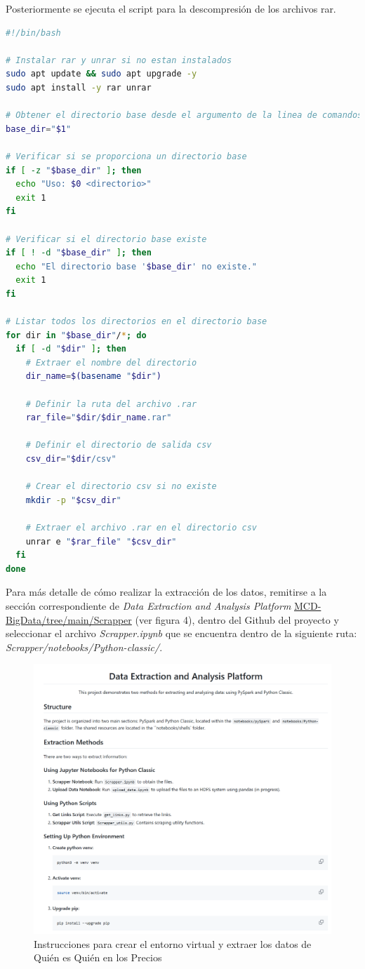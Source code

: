 \documentclass{article}
\begin{document}
Posteriormente se ejecuta el script para la descompresión de los archivos rar.

\begin{lstlisting}[language=bash,caption={bash version}]
#!/bin/bash

# Instalar rar y unrar si no estan instalados
sudo apt update && sudo apt upgrade -y
sudo apt install -y rar unrar

# Obtener el directorio base desde el argumento de la linea de comandos
base_dir="$1"

# Verificar si se proporciona un directorio base
if [ -z "$base_dir" ]; then
  echo "Uso: $0 <directorio>"
  exit 1
fi

# Verificar si el directorio base existe
if [ ! -d "$base_dir" ]; then
  echo "El directorio base '$base_dir' no existe."
  exit 1
fi

# Listar todos los directorios en el directorio base
for dir in "$base_dir"/*; do
  if [ -d "$dir" ]; then
    # Extraer el nombre del directorio
    dir_name=$(basename "$dir")
    
    # Definir la ruta del archivo .rar
    rar_file="$dir/$dir_name.rar"
    
    # Definir el directorio de salida csv
    csv_dir="$dir/csv"
    
    # Crear el directorio csv si no existe
    mkdir -p "$csv_dir"
    
    # Extraer el archivo .rar en el directorio csv
    unrar e "$rar_file" "$csv_dir"
  fi
done
\end{lstlisting}

\newpage
Para más detalle de cómo realizar la extracción de los datos, remitirse a la sección correspondiente de \textit{Data Extraction and Analysis Platform} \href{https://github.com/Anonymate054/MCD-BigData/tree/main/Scrapper}{MCD-BigData/tree/main/Scrapper} (ver figura 4), dentro del Github del proyecto y seleccionar el archivo \textit{Scrapper.ipynb} que se encuentra dentro de la siguiente ruta: \textit{Scrapper/notebooks/Python-classic/}.


\begin{figure}[h]
\centering
\includegraphics[width=0.7\linewidth]{Reports/images/Extraction.png}
\caption{\label{fig:Extracción}Instrucciones para crear el entorno virtual y extraer los datos de Quién es Quién en los Precios}
\end{figure}
\end{document}
